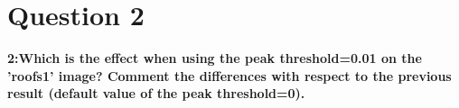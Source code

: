 \section{Question 2}

{\bfseries 2:Which is the effect when using the peak threshold=0.01 on the
'roofs1' image? Comment the differences with respect to the previous result
(default value of the peak threshold=0).}